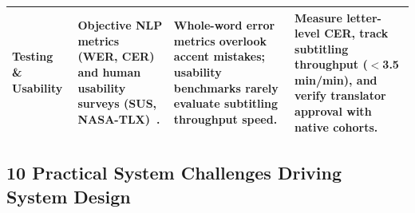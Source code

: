 \documentclass[conference]{IEEEtran}
\begin{document}
\begin{table}[t]
\begin{tabular}{>{\raggedright\arraybackslash}p{2.8cm} >{\raggedright\arraybackslash}p{4.2cm} >{\raggedright\arraybackslash}p{4.6cm} >{\raggedright\arraybackslash}p{4.8cm}}
\addlinespace
\textbf{Testing \& Usability} & Objective NLP metrics (WER, CER) and human usability surveys (SUS, NASA-TLX)~\cite{norman1986user}. & Whole-word error metrics overlook accent mistakes; usability benchmarks rarely evaluate subtitling throughput speed. & Measure letter-level CER, track subtitling throughput ($<$3.5 min/min), and verify translator approval with native cohorts. \\
\bottomrule
\end{tabular}
\end{table}

\subsection{10 Practical System Challenges Driving System Design}
\label{sec:sota:challenges}
\end{document}
